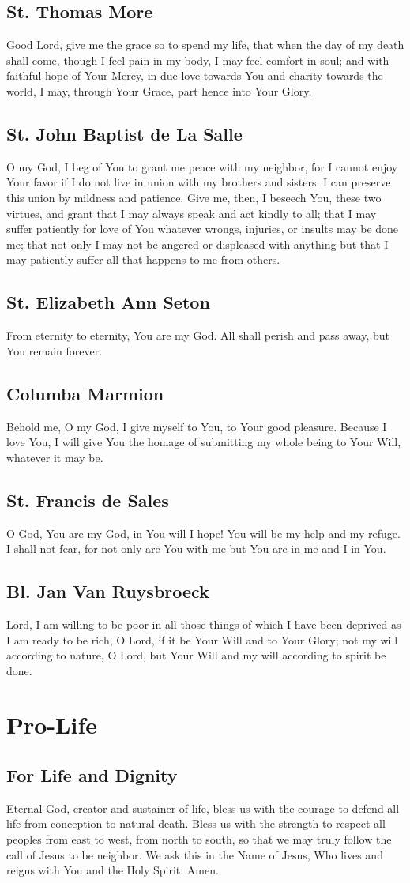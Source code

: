 \documentclass[12pt]{article}
\newcommand{\prayersection}[1]{\section{#1}}
\newcommand{\prayertitle}[1]{\subsection{#1}}
\begin{document}
\prayertitle{St. Thomas More}
Good Lord, give me the grace so to spend my life, that when the day of my death shall come, though I feel pain in my body, I may feel comfort in soul;
and with faithful hope of Your Mercy, in due love towards You and charity towards the world, I may, through Your Grace, part hence into Your Glory.

\prayertitle{St. John Baptist de La Salle}
O my God, I beg of You to grant me peace with my neighbor, for I cannot enjoy Your favor if I do not live in union with my brothers and sisters.
I can preserve this union by mildness and patience.
Give me, then, I beseech You, these two virtues, and grant that I may always speak and act kindly to all;
that I may suffer patiently for love of You whatever wrongs, injuries, or insults may be done me;
that not only I may not be angered or displeased with anything but that I may patiently suffer all that happens to me from others.

\prayertitle{St. Elizabeth Ann Seton}
From eternity to eternity, You are my God.
All shall perish and pass away, but You remain forever.

\prayertitle{Columba Marmion}
Behold me, O my God, I give myself to You, to Your good pleasure.
Because I love You, I will give You the homage of submitting my whole being to Your Will, whatever it may be.

\prayertitle{St. Francis de Sales}
O God, You are my God, in You will I hope!
You will be my help and my refuge.
I shall not fear, for not only are You with me but You are in me and I in You.

\prayertitle{Bl. Jan Van Ruysbroeck}
Lord, I am willing to be poor in all those things of which I have been deprived as I am ready to be rich, O Lord, if it be Your Will and to Your Glory;
not my will according to nature, O Lord, but Your Will and my will according to spirit be done.

\newpage

\prayersection{Pro-Life}
\prayertitle{For Life and Dignity}
Eternal God, creator and sustainer of life, bless us with the courage to defend all life from conception to natural death.
Bless us with the strength to respect all peoples from east to west, from north to south,
so that we may truly follow the call of Jesus to be neighbor.
We ask this in the Name of Jesus, Who lives and reigns with You and the Holy Spirit.
Amen.
\end{document}
